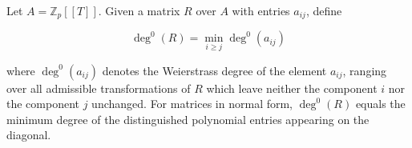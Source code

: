 Let $A = \mathbb{Z}_p[[T]]$. Given a matrix $R$ over $A$ with entries $a_{ij}$, define

$$
\deg^0(R) = \min_{i \ge j} \deg^0(a_{ij})
$$

where $\deg^0(a_{ij})$ denotes the Weierstrass degree of the element $a_{ij}$, ranging over all admissible transformations of $R$ which leave neither the component $i$ nor the component $j$ unchanged. For matrices in normal form, $\deg^0(R)$ equals the minimum degree of the distinguished polynomial entries appearing on the diagonal.
